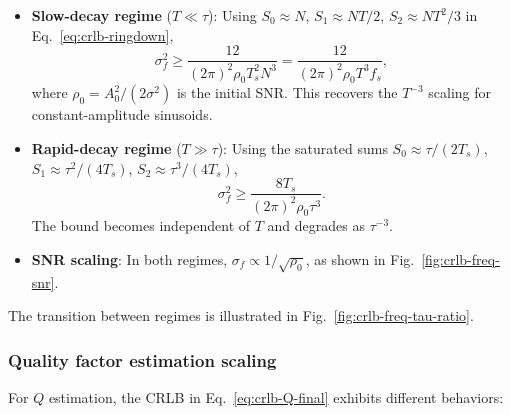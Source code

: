 \documentclass[11pt]{article}
\begin{document}
\begin{itemize}
\item \textbf{Slow-decay regime} ($T \ll \tau$): Using $S_0 \approx N$, $S_1 \approx NT/2$, $S_2 \approx NT^2/3$ in Eq.~\eqref{eq:crlb-ringdown},
  \begin{equation}
  \sigma_f^2 \ge \frac{12}{(2\pi)^2 \rho_0 T_s^2 N^3} = \frac{12}{(2\pi)^2 \rho_0 T^3 f_s},
  \label{eq:scaling-slow-decay}
  \end{equation}
  where $\rho_0 = A_0^2/(2\sigma^2)$ is the initial SNR. This recovers the $T^{-3}$ scaling for constant-amplitude sinusoids.

\item \textbf{Rapid-decay regime} ($T \gg \tau$): Using the saturated sums $S_0 \approx \tau/(2T_s)$, $S_1 \approx \tau^2/(4T_s)$, $S_2 \approx \tau^3/(4T_s)$,
  \begin{equation}
  \sigma_f^2 \ge \frac{8T_s}{(2\pi)^2 \rho_0 \tau^3}.
  \label{eq:scaling-rapid-decay}
  \end{equation}
  The bound becomes independent of $T$ and degrades as $\tau^{-3}$.

\item \textbf{SNR scaling}: In both regimes, $\sigma_f \propto 1/\sqrt{\rho_0}$, as shown in Fig.~\ref{fig:crlb-freq-snr}.
\end{itemize}

The transition between regimes is illustrated in Fig.~\ref{fig:crlb-freq-tau-ratio}.

\subsubsection{Quality factor estimation scaling}

For $Q$ estimation, the CRLB in Eq.~\eqref{eq:crlb-Q-final} exhibits different behaviors:
\end{document}
